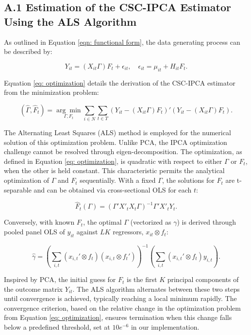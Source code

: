 \documentclass[12pt]{article}
\begin{document}
\subsection*{A.1 Estimation of the CSC-IPCA Estimator Using the ALS Algorithm}

As outlined in Equation \ref{eqn: functional form}, the data generating process can be described by:

\begin{equation*}
Y_{it} = (X_{it}\Gamma) F_{t} + \epsilon_{it}, \quad \epsilon_{it} = \mu_{it} + H_{it} F_t.
\end{equation*}

Equation \ref{eq: optimization} details the derivation of the CSC-IPCA estimator from the minimization problem:

\begin{equation*}
(\hat{\Gamma}, \hat{F}_t) = \underset{\Gamma, F_t}{\arg\min} \sum_{i \in N} \sum_{t \in T} \left( Y_{it} - (X_{it}\Gamma) F_{t} \right)' \left( Y_{it} - (X_{it}\Gamma) F_{t} \right).
\end{equation*}

The Alternating Least Squares (ALS) method is employed for the numerical solution of this optimization problem. Unlike PCA, the IPCA optimization challenge cannot be resolved through eigen-decomposition. The optimization, as defined in Equation \ref{eq: optimization}, is quadratic with respect to either $\Gamma$ or $F_t$, when the other is held constant. This characteristic permits the analytical optimization of $\Gamma$ and $F_t$ sequentially. With a fixed $\Gamma$, the solutions for $F_t$ are t-separable and can be obtained via cross-sectional OLS for each $t$:

\begin{equation*}
\hat{F}_t(\Gamma) = (\Gamma' X'_t X_t \Gamma)^{-1} \Gamma' X'_t Y_t.
\end{equation*}

Conversely, with known $F_{t}$, the optimal $\Gamma$ (vectorized as $\gamma$) is derived through pooled panel OLS of $y_{it}$ against $LK$ regressors, $x_{it} \otimes f_t$:

\begin{equation*}
\hat{\gamma} = \left( \sum_{i,t} (x_{i,t}' \otimes f_t) (x_{i,t} \otimes f_t') \right)^{-1} \left( \sum_{i,t} (x_{i,t}' \otimes f_t) y_{i,t} \right).
\end{equation*}

Inspired by PCA, the initial guess for $F_t$ is the first $K$ principal components of the outcome matrix $Y_{it}$. The ALS algorithm alternates between these two steps until convergence is achieved, typically reaching a local minimum rapidly. The convergence criterion, based on the relative change in the optimization problem from Equation \ref{eq: optimization}, ensures termination when this change falls below a predefined threshold, set at $10e^{-6}$ in our implementation.
\end{document}
